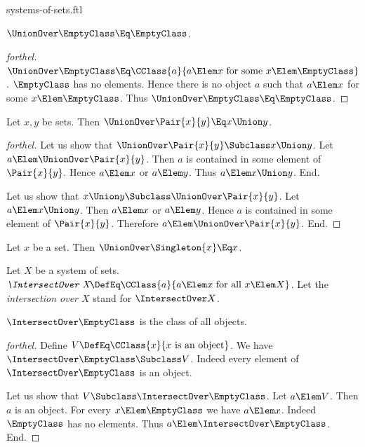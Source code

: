 \documentclass{stex}
\begin{document}
\begin{smodule}{systems-of-sets.ftl}
\begin{proposition*}[forthel]
  $\UnionOver \EmptyClass \Eq \EmptyClass$.
\end{proposition*}
\begin{proof}[forthel]
  $\UnionOver \EmptyClass \Eq \CClass{a}{a \Elem x\text{ for some }x \Elem \EmptyClass}$.
  $\EmptyClass$ has no elements.
  Hence there is no object $a$ such that $a \Elem x$ for some $x \Elem \EmptyClass$.
  Thus $\UnionOver \EmptyClass \Eq \EmptyClass$.
\end{proof}

\begin{proposition*}[forthel]
  Let $x, y$ be sets.
  Then $\UnionOver \Pair{x}{y} \Eq x \Union y$.
\end{proposition*}
\begin{proof}[forthel]
  Let us show that $\UnionOver \Pair{x}{y} \Subclass x \Union y$.
    Let $a \Elem \UnionOver \Pair{x}{y}$.
    Then $a$ is contained in some element of $\Pair{x}{y}$.
    Hence $a \Elem x$ or $a \Elem y$.
    Thus $a \Elem x \Union y$.
  End.

  Let us show that $x \Union y \Subclass \UnionOver \Pair{x}{y}$.
    Let $a \Elem x \Union y$.
    Then $a \Elem x$ or $a \Elem y$.
    Hence $a$ is contained in some element of $\Pair{x}{y}$.
    Therefore $a \Elem \UnionOver \Pair{x}{y}$.
  End.
\end{proof}

\begin{proposition*}[forthel]
  Let $x$ be a set.
  Then $\UnionOver \Singleton{x} \Eq x$.
\end{proposition*}

\begin{definition*}[forthel,for=intersection over]
  Let $X$ be a system of sets.
  $\emph{\IntersectOver X} \DefEq \CClass{a}{a \Elem x\text{ for all }x \Elem X}$.
  Let the \emph{intersection over $X$} stand for $\IntersectOver X$.
\end{definition*}

\begin{proposition*}[forthel]
  $\IntersectOver \EmptyClass$ is the class of all objects.
\end{proposition*}
\begin{proof}[forthel]
  Define $V \DefEq \CClass{x}{x\text{ is an object}}$.
  We have $\IntersectOver \EmptyClass \Subclass V$.
  Indeed every element of $\IntersectOver \EmptyClass$ is an object.

  Let us show that $V \Subclass \IntersectOver \EmptyClass$.
    Let $a \Elem V$.
    Then $a$ is an object.
    For every $x \Elem \EmptyClass$ we have $a \Elem x$.
    Indeed $\EmptyClass$ has no elements.
    Thus $a \Elem \IntersectOver \EmptyClass$.
  End.
\end{proof}


\end{smodule}
\end{document}
